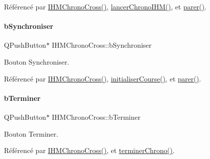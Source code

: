 Référencé par \hyperlink{class_i_h_m_chrono_cross_a479fc90733fba3e65fb06aa4a3adc02e}{I\+H\+M\+Chrono\+Cross()}, \hyperlink{class_i_h_m_chrono_cross_a0e78f2d4d5e46c4551fc4517614a56d8}{lancer\+Chrono\+I\+H\+M()}, et \hyperlink{class_i_h_m_chrono_cross_aa272ffa273fc8c487ea64ef6a43b4439}{parer()}.

\mbox{\label{class_i_h_m_chrono_cross_aaef501bd1190a5ec06a214d3265b8c0b}} 
\paragraph{\texorpdfstring{b\+Synchroniser}{bSynchroniser}}
{\footnotesize\ttfamily Q\+Push\+Button$\ast$ I\+H\+M\+Chrono\+Cross\+::b\+Synchroniser\hspace{0.3cm}{\ttfamily [private]}}



Bouton Synchroniser. 



Référencé par \hyperlink{class_i_h_m_chrono_cross_a479fc90733fba3e65fb06aa4a3adc02e}{I\+H\+M\+Chrono\+Cross()}, \hyperlink{class_i_h_m_chrono_cross_adde019cc3799befac3fd9555e392eab9}{initialiser\+Course()}, et \hyperlink{class_i_h_m_chrono_cross_aa272ffa273fc8c487ea64ef6a43b4439}{parer()}.

\mbox{\label{class_i_h_m_chrono_cross_a63721ec2d7d51b11b164b4502ace8262}} 
\paragraph{\texorpdfstring{b\+Terminer}{bTerminer}}
{\footnotesize\ttfamily Q\+Push\+Button$\ast$ I\+H\+M\+Chrono\+Cross\+::b\+Terminer\hspace{0.3cm}{\ttfamily [private]}}



Bouton Terminer. 



Référencé par \hyperlink{class_i_h_m_chrono_cross_a479fc90733fba3e65fb06aa4a3adc02e}{I\+H\+M\+Chrono\+Cross()}, et \hyperlink{class_i_h_m_chrono_cross_a32ee157ca6bd8c3e94b57f3cecdeee4e}{terminer\+Chrono()}.

